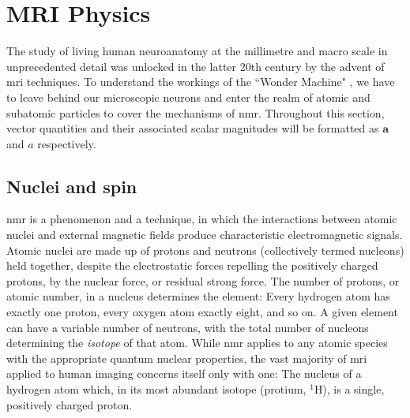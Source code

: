 \section{MRI Physics}

The study of living human neuroanatomy at the millimetre and macro scale in unprecedented detail was unlocked in the latter 20th century by the advent of \gls{mri} techniques.
To understand the workings of the ``Wonder Machine" , we have to leave behind our microscopic neurons and enter the realm of atomic and subatomic particles to cover the mechanisms of \gls{nmr}.
Throughout this section, vector quantities and their associated scalar magnitudes will be formatted as $\mathbf{a}$ and $a$ respectively.

\subsection{Nuclei and spin}

\gls{nmr} is a phenomenon and a technique, in which the interactions between atomic nuclei and external magnetic fields produce characteristic electromagnetic signals.
Atomic nuclei are made up of protons and neutrons (collectively termed nucleons) held together, despite the electrostatic forces repelling the positively charged protons, by the nuclear force, or residual strong force.
The number of protons, or atomic number, in a nucleus determines the element: Every hydrogen atom has exactly one proton, every oxygen atom exactly eight, and so on.
A given element can have a variable number of neutrons, with the total number of nucleons determining the \textit{isotope} of that atom.
While \gls{nmr} applies to any atomic species with the appropriate quantum nuclear properties, the vast majority of \gls{mri} applied to human imaging concerns itself only with one:
The nucleus of a hydrogen atom which, in its most abundant isotope (protium, $^1$H), is a single, positively charged proton.

